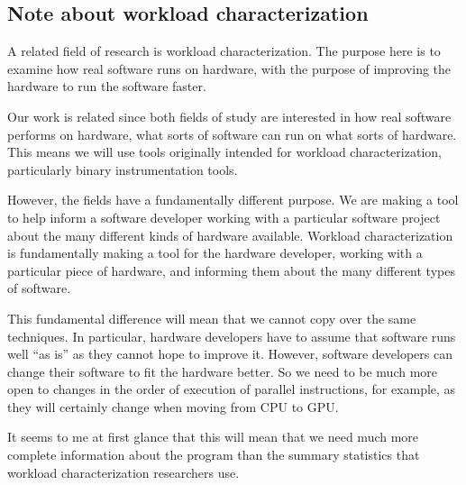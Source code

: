 \documentclass[12pt,twoside]{reedthesis}
\begin{document}
		
		
		
		
	\subsection{Note about workload characterization}
		
		A related field of research is workload characterization. The purpose here is to examine how real software runs on hardware, with the purpose of improving the hardware to run the software faster. 
		
		Our work is related since both fields of study are interested in how real software performs on hardware, what sorts of software can run on what sorts of hardware. This means we will use tools originally intended for workload characterization, particularly binary instrumentation tools.
		
		However, the fields have a fundamentally different purpose. We are making a tool to help inform a software developer working with a particular software project about the many different kinds of hardware available. Workload characterization is fundamentally making a tool for the hardware developer, working with a particular piece of hardware, and informing them about the many different types of software. 
		
		This fundamental difference will mean that we cannot copy over the same techniques. In particular, hardware developers have to assume that software runs well “as is” as they cannot hope to improve it. However, software developers can change their software to fit the hardware better. So we need to be much more open to changes in the order of execution of parallel instructions, for example, as they will certainly change when moving from CPU to GPU. 
		
		It seems to me at first glance that this will mean that we need much more complete information about the program than the summary statistics that workload characterization researchers use. 
		
\end{document}
